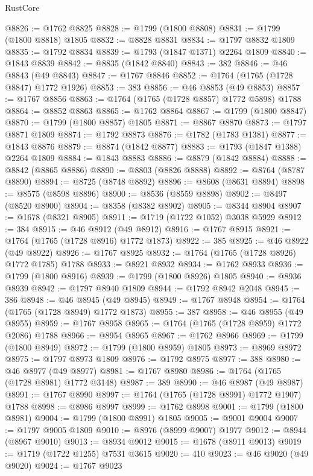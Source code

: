 \begin{lexlean}{RustCore}
\begin{coremodule}
@8826 := @1762 @8825
@8828 := @1799 (@1800 @8808)
@8831 := @1799 (@1800 @8818) @1805
@8832 := @8828 @8831
@8834 := @1797 @8832 @1809
@8835 := @1792 @8834
@8839 := @1793 (@1847 @1371) @2264 @1809
@8840 := @1843 @8839
@8842 := @8835 (@1842 @8840)
@8843 := 382
@8846 := @46 @8843 (@49 @8843)
@8847 := @1767 @8846
@8852 := @1764 (@1765 (@1728 @8847) @1772 @1926)
@8853 := 383
@8856 := @46 @8853 (@49 @8853)
@8857 := @1767 @8856
@8863 := @1764 (@1765 (@1728 @8857) @1772 @5898) @1788
@8864 := @8852 @8863
@8865 := @1762 @8864
@8867 := @1799 (@1800 @8847)
@8870 := @1799 (@1800 @8857) @1805
@8871 := @8867 @8870
@8873 := @1797 @8871 @1809
@8874 := @1792 @8873
@8876 := @1782 (@1783 @1381)
@8877 := @1843 @8876
@8879 := @8874 (@1842 @8877)
@8883 := @1793 (@1847 @1388) @2264 @1809
@8884 := @1843 @8883
@8886 := @8879 (@1842 @8884)
@8888 := @8842 (@8865 @8886)
@8890 := @8803 (@8826 @8888)
@8892 := @8764 (@8787 @8890)
@8894 := @8725 (@8748 @8892)
@8896 := @8608 (@8631 @8894)
@8898 := @8575 (@8598 @8896)
@8900 := @8536 (@8559 @8898)
@8902 := @8497 (@8520 @8900)
@8904 := @8358 (@8382 @8902)
@8905 := @8344 @8904
@8907 := @1678 (@8321 @8905)
@8911 := @1719 (@1722 @1052) @3038 @5929
@8912 := 384
@8915 := @46 @8912 (@49 @8912)
@8916 := @1767 @8915
@8921 := @1764 (@1765 (@1728 @8916) @1772 @1873)
@8922 := 385
@8925 := @46 @8922 (@49 @8922)
@8926 := @1767 @8925
@8932 := @1764 (@1765 (@1728 @8926) @1772 @1785) @1788
@8933 := @8921 @8932
@8934 := @1762 @8933
@8936 := @1799 (@1800 @8916)
@8939 := @1799 (@1800 @8926) @1805
@8940 := @8936 @8939
@8942 := @1797 @8940 @1809
@8944 := @1792 @8942 @2048
@8945 := 386
@8948 := @46 @8945 (@49 @8945)
@8949 := @1767 @8948
@8954 := @1764 (@1765 (@1728 @8949) @1772 @1873)
@8955 := 387
@8958 := @46 @8955 (@49 @8955)
@8959 := @1767 @8958
@8965 := @1764 (@1765 (@1728 @8959) @1772 @2086) @1788
@8966 := @8954 @8965
@8967 := @1762 @8966
@8969 := @1799 (@1800 @8949)
@8972 := @1799 (@1800 @8959) @1805
@8973 := @8969 @8972
@8975 := @1797 @8973 @1809
@8976 := @1792 @8975
@8977 := 388
@8980 := @46 @8977 (@49 @8977)
@8981 := @1767 @8980
@8986 := @1764 (@1765 (@1728 @8981) @1772 @3148)
@8987 := 389
@8990 := @46 @8987 (@49 @8987)
@8991 := @1767 @8990
@8997 := @1764 (@1765 (@1728 @8991) @1772 @1907) @1788
@8998 := @8986 @8997
@8999 := @1762 @8998
@9001 := @1799 (@1800 @8981)
@9004 := @1799 (@1800 @8991) @1805
@9005 := @9001 @9004
@9007 := @1797 @9005 @1809
@9010 := @8976 (@8999 @9007) @1977
@9012 := @8944 (@8967 @9010)
@9013 := @8934 @9012
@9015 := @1678 (@8911 @9013)
@9019 := @1719 (@1722 @1255) @7531 @3615
@9020 := 410
@9023 := @46 @9020 (@49 @9020)
@9024 := @1767 @9023

\end{coremodule}
\end{lexlean}
